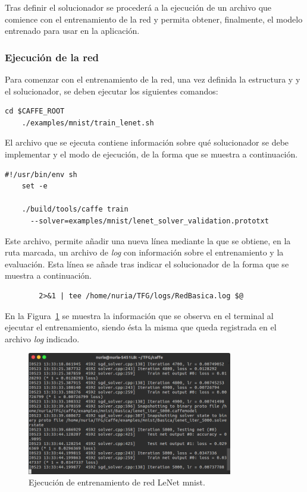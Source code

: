 	Tras definir el solucionador se procederá a la ejecución de un archivo que comience con el entrenamiento de la red y permita obtener, finalmente, el modelo entrenado para usar en la aplicación.\\
	
\subsubsection{Ejecución de la red}
	Para comenzar con el entrenamiento de la red, una vez definida la estructura y y el solucionador, se deben ejecutar los siguientes comandos:
	\vspace{10pt}
	\begin{lstlisting}[frame=single]
	cd $CAFFE_ROOT
	./examples/mnist/train_lenet.sh	
	\end{lstlisting}
	
	El archivo que se ejecuta contiene información sobre qué solucionador se debe implementar y el modo de ejecución, de la forma que se muestra a continuación.
	\vspace{10pt}
	\begin{lstlisting}[frame=single]
	#!/usr/bin/env sh
	set -e
	
	./build/tools/caffe train 
	  --solver=examples/mnist/lenet_solver_validation.prototxt 
	\end{lstlisting}
	Este archivo, permite añadir una nueva línea mediante la que se obtiene, en la ruta marcada, un archivo de \textit{log} con información sobre el entrenamiento y la evaluación. Esta línea se añade tras indicar el solucionador de la forma que se muestra a continuación.
	\vspace{10pt}
	\begin{lstlisting}
		2>&1 | tee /home/nuria/TFG/logs/RedBasica.log $@
	\end{lstlisting} 
	
	En la Figura~\ref{fig.entrenamiento} se muestra la información que se observa en el terminal al ejecutar el entrenamiento, siendo ésta la misma que queda registrada en el archivo \textit{log} indicado.
	
	\begin{figure}[H]
		\begin{center}
			\includegraphics[width=0.8\textwidth]{figures/RedBasica5000}
			\caption{Ejecución de entrenamiento de red LeNet \acrshort{mnist}.}
			\label{fig.entrenamiento}
		\end{center}
	\end{figure}
	

